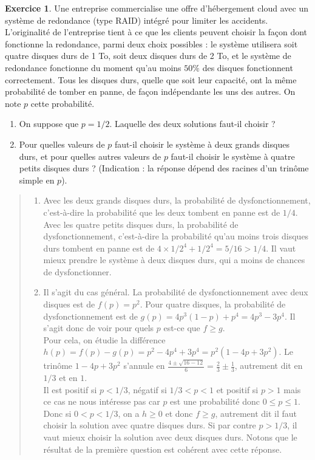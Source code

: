 \documentclass[10pt]{article}
\theoremstyle{definition}
\newtheorem{exo}{Exercice}
\newenvironment{solution}{\begin{quote}\color{teal}}{\end{quote}}
\begin{document}
 \begin{exo}
 Une entreprise commercialise une offre d'hébergement cloud avec un système de redondance (type RAID) intégré pour limiter les accidents.
L'originalité de l'entreprise tient à ce que les clients peuvent choisir la façon dont fonctionne la redondance, parmi deux choix possibles : le système utilisera soit quatre disques durs de 1 To, soit deux disques durs de 2 To, et le système de redondance fonctionne du moment qu'au moins $50\%$ des disques  fonctionnent correctement.
Tous les disques durs, quelle que soit leur capacité, ont la même probabilité de tomber en panne, de façon indépendante les uns des autres. On note $p$ cette probabilité.
\begin{enumerate}
\item On suppose que $p=1/2$. Laquelle des deux solutions faut-il choisir ?
\item Pour quelles valeurs de $p$ faut-il choisir le système à deux grands disques durs, et pour quelles autres valeurs de $p$ faut-il choisir le système à quatre petits disques durs ? (Indication : la réponse dépend des racines d'un trinôme simple en $p$).
\end{enumerate}

\begin{solution}%

\begin{enumerate}
\item Avec les deux grands disques durs, la probabilité de dysfonctionnement, c'est-à-dire la probabilité que les deux tombent en panne est de $1/4$.
Avec les quatre petits disques durs, la probabilité de dysfonctionnement, c'est-à-dire la probabilité qu'au moins trois disques durs tombent en panne est de $4\times 1/2^4+ 1/2^4=5/16>1/4$.
 Il vaut mieux prendre le système à deux disques durs, qui a moins de chances de dysfonctionner.
\item Il s'agit du cas général.
La probabilité de dysfonctionnement avec deux disques est de $f(p)=p^2$.
Pour quatre disques, la probabilité de dysfonctionnement est de $g(p)=4p^3(1-p)+p^4=4p^3-3p^4$.
Il s'agit donc de voir pour quels $p$ est-ce que $f\geq g$.\\
Pour cela, on étudie la différence $h(p)=f(p)-g(p) = p^2 -4p^4+3p^4= p^2(1-4p+3p^2)$.
Le trinôme $1-4p+3p^2$ s'annule en $\frac{4\pm \sqrt{16-12}}{6} = \frac{2}{3}\pm \frac{1}{3}$, autrement dit en $1/3$ et en $1$.\\%
Il est positif si $p<1/3$, négatif si $1/3<p<1$ et positif si $p>1$ mais ce cas ne nous intéresse pas car $p$ est une probabilité donc $0\leq p\leq 1$.
Donc si $0<p<1/3$, on a $h\geq 0$ et donc $f\geq g$, autrement dit il faut choisir la solution avec quatre disques durs. Si par contre $p>1/3$, il vaut mieux choisir la solution avec deux disques durs. Notons que le résultat de la première question est cohérent avec cette réponse.
\end{enumerate}

\end{solution}

 \end{exo}
\end{document}
